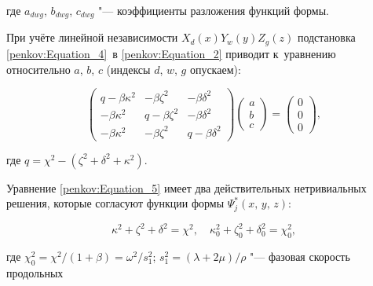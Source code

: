 где $a _{dwg}$, $b _{dwg}$, $c_{dwg}$ "--- коэффициенты разложения функций формы. 



При учёте линейной независимости $X _{d} ( x ) Y _{w} ( y ) Z_{g} ( z )$ подстановка \eqref{penkov:Equation_4}~в \eqref{penkov:Equation_2} приводит к~уравнению относительно $a$, $b$, $c$ (индексы $d$, $w$, $g$ опускаем):

\begin{equation}

\label{penkov:Equation_5}

\begin{pmatrix}

q - \beta \kappa^2  &  - \beta \zeta^2   &  - \beta \delta^2 \\

- \beta \kappa^2    &  q - \beta \zeta^2 &  - \beta \delta^2 \\

- \beta \kappa^2    &  - \beta \zeta^2   & q - \beta \delta^2

\end{pmatrix}

\begin{pmatrix}

 a \\ b \\ c

\end{pmatrix}

= \begin{pmatrix} 0 \\ 0 \\ 0

\end{pmatrix},

\end{equation}

где $q = \chi^2 - (\zeta^2 + \delta^2 + \kappa^2)$.



Уравнение \eqref{penkov:Equation_5} имеет два действительных нетривиальных решения, которые согласуют функции формы $\Psi^{*}_{j} (x,\,y,\,z)$:

\begin{equation}

\label{penkov:Equation_6} \kappa^2 + \zeta^2 + \delta^2 = \chi^2, \quad \kappa_0^2 + \zeta_0^2 + \delta_0^2 = \chi_0^2,

\end{equation}

где $\chi_0^2 = \chi^2 / ( 1 + \beta ) = \omega^2 / s_1^2$; $s_1^2 = ( \lambda + 2 \mu) / \rho$ "--- фазовая скорость продольных

